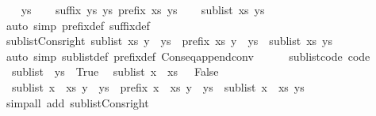 \begin{isabellebody}
\isamarkupfalse%
\isanewline
\ \ \isamarkupfalse%
\ ys{\isacharprime}\isanewline
\ \ \isamarkupfalse%
\ {\isachardoublequoteopen}suffix\ ys{\isacharprime}\ ys{\isachardoublequoteclose}\ {\isachardoublequoteopen}prefix\ xs\ ys{\isacharprime}{\isachardoublequoteclose}\isanewline
\ \ \isamarkupfalse%
\ {\isachardoublequoteopen}sublist\ xs\ ys{\isachardoublequoteclose}\ \isamarkupfalse%
\ {\isacharparenleft}auto\ simp{\isacharcolon}\ prefix{\isacharunderscore}def\ suffix{\isacharunderscore}def{\isacharparenright}\isanewline
{}\isamarkupfalse%
%
\endisatagproof
{\isafoldproof}%
%
\isadelimproof
\isanewline
%
\endisadelimproof
\isanewline
{}\isamarkupfalse%
\ sublist{\isacharunderscore}Cons{\isacharunderscore}right{\isacharcolon}\ {\isachardoublequoteopen}sublist\ xs\ {\isacharparenleft}y\ {\isacharhash}\ ys{\isacharparenright}\ {\isasymlongleftrightarrow}\ prefix\ xs\ {\isacharparenleft}y\ {\isacharhash}\ ys{\isacharparenright}\ {\isasymor}\ sublist\ xs\ ys{\isachardoublequoteclose}\isanewline
%
\isadelimproof
\ \ %
\endisadelimproof
%
\isatagproof
{}\isamarkupfalse%
\ {\isacharparenleft}auto\ simp{\isacharcolon}\ sublist{\isacharunderscore}def\ prefix{\isacharunderscore}def\ Cons{\isacharunderscore}eq{\isacharunderscore}append{\isacharunderscore}conv{\isacharparenright}%
\endisatagproof
{\isafoldproof}%
%
\isadelimproof
\isanewline
%
\endisadelimproof
\ \ \ \ \isanewline
{}\isamarkupfalse%
\ sublist{\isacharunderscore}code\ {\isacharbrackleft}code{\isacharbrackright}{\isacharcolon}\isanewline
\ \ {\isachardoublequoteopen}sublist\ {\isacharbrackleft}{\isacharbrackright}\ ys\ {\isasymlongleftrightarrow}\ True{\isachardoublequoteclose}\isanewline
\ \ {\isachardoublequoteopen}sublist\ {\isacharparenleft}x\ {\isacharhash}\ xs{\isacharparenright}\ {\isacharbrackleft}{\isacharbrackright}\ {\isasymlongleftrightarrow}\ False{\isachardoublequoteclose}\isanewline
\ \ {\isachardoublequoteopen}sublist\ {\isacharparenleft}x\ {\isacharhash}\ xs{\isacharparenright}\ {\isacharparenleft}y\ {\isacharhash}\ ys{\isacharparenright}\ {\isasymlongleftrightarrow}\ prefix\ {\isacharparenleft}x\ {\isacharhash}\ xs{\isacharparenright}\ {\isacharparenleft}y\ {\isacharhash}\ ys{\isacharparenright}\ {\isasymor}\ sublist\ {\isacharparenleft}x\ {\isacharhash}\ xs{\isacharparenright}\ ys{\isachardoublequoteclose}\isanewline
%
\isadelimproof
\ \ %
\endisadelimproof
%
\isatagproof
{}\isamarkupfalse%
\ {\isacharparenleft}simp{\isacharunderscore}all\ add{\isacharcolon}\ sublist{\isacharunderscore}Cons{\isacharunderscore}right{\isacharparenright}%

\end{isabellebody}
